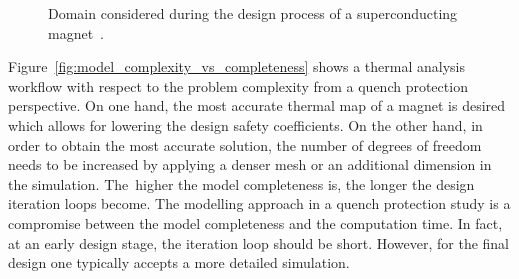 \begin{figure}[H]
    \centering
    \caption{Domain considered during the design process of a superconducting magnet~\cite{quench_protection_system_applied_prioli}.}
    \label{fig:magnet_design_domains}
\end{figure}

Figure~\ref{fig:model_complexity_vs_completeness} shows a thermal analysis workflow with respect to the problem complexity from a quench protection perspective. On one hand, the most accurate thermal map of a magnet is desired which allows for lowering the design safety coefficients. On the other hand, in order to obtain the most accurate solution, the number of degrees of freedom needs to be increased by applying a denser mesh or an additional dimension in the simulation. The~higher the model completeness is, the longer the design iteration loops become. The modelling approach in a quench protection study is a compromise between the model completeness and the computation time. In fact, at an early design stage, the iteration loop should be short. However, for the final design one typically accepts a more detailed simulation. 

